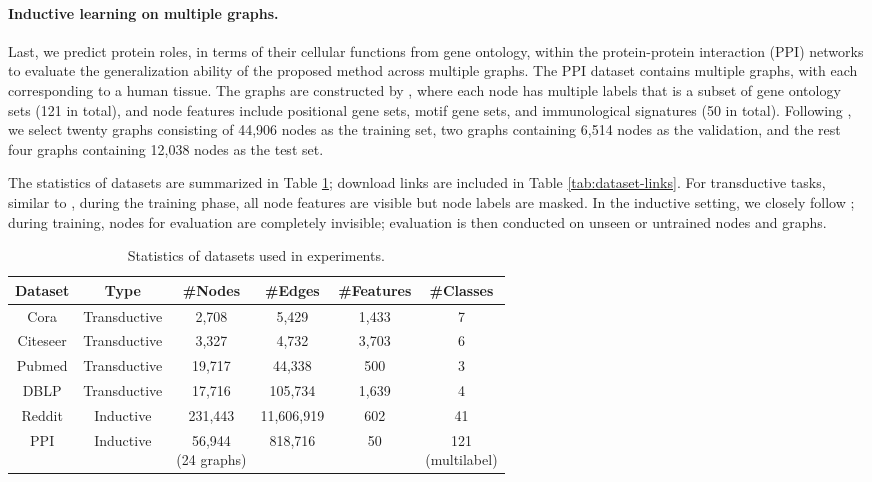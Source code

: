 \documentclass{article}
\theoremstyle{remark}
\begin{document}
\paragraph{Inductive learning on multiple graphs.}
Last, we predict protein roles, in terms of their cellular functions from gene ontology, within the protein-protein interaction (PPI) networks \cite{Zitnik:2017uz} to evaluate the generalization ability of the proposed method across multiple graphs.
The PPI dataset contains multiple graphs, with each corresponding to a human tissue.
The graphs are constructed by \cite{Hamilton:2017tp}, where each node has multiple labels that is a subset of gene ontology sets (121 in total), and node features include positional gene sets, motif gene sets, and immunological signatures (50 in total).
Following \cite{Hamilton:2017tp}, we select twenty graphs consisting of 44,906 nodes as the training set, two graphs containing 6,514 nodes as the validation, and the rest four graphs containing 12,038 nodes as the test set.

The statistics of datasets are summarized in Table \ref{tab:dataset-statistics}; download links are included in Table \ref{tab:dataset-links}.
For transductive tasks, similar to \cite{Kipf:2016tc}, during the training phase, all node features are visible but node labels are masked. In the inductive setting, we closely follow \cite{Hamilton:2017tp}; during training, nodes for evaluation are completely invisible; evaluation is then conducted on unseen or untrained nodes and graphs.

\begin{table}[h]
	\centering
	\caption{Statistics of datasets used in experiments.}
	\label{tab:dataset-statistics}
\begin{tabular}{cccccc}
	\toprule
	Dataset & Type & \#Nodes & \#Edges & \#Features & \#Classes \\
	\midrule
	Cora & Transductive & 2,708 & 5,429 & 1,433 & 7 \\
	Citeseer & Transductive & 3,327 & 4,732 & 3,703 & 6 \\
	Pubmed & Transductive & 19,717 & 44,338 & 500 & 3 \\
	DBLP & Transductive & 17,716 & 105,734 & 1,639 & 4 \\
	\midrule
	Reddit & Inductive & 231,443 & 11,606,919 & 602 & 41 \\
	PPI & Inductive & \makecell{56,944 \\(24 graphs)} & 818,716 & 50 & \makecell{121 \\(multilabel)} \\
	\bottomrule
	\end{tabular}
\end{table}
\end{document}
